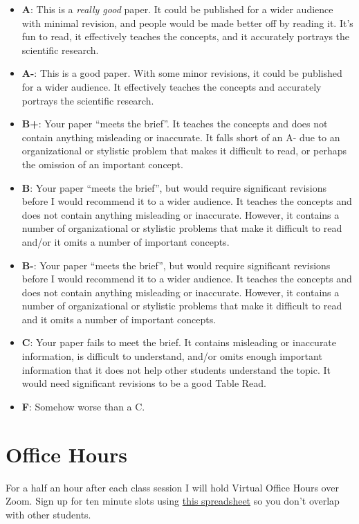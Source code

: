 \documentclass[11pt, letterpaper]{article}
\begin{document}
\begin{itemize}
	\item \textbf{A}: This is a \textit{really good} paper. It could be published for a wider audience with minimal revision, and people would be made better off by reading it. It's fun to read, it effectively teaches the concepts, and it accurately portrays the scientific research.
	\item \textbf{A-}: This is a good paper. With some minor revisions, it could be published for a wider audience. It effectively teaches the concepts and accurately portrays the scientific research. 
	\item \textbf{B+}: Your paper ``meets the brief''. It teaches the concepts and does not contain anything misleading or inaccurate. It falls short of an A- due to an organizational or stylistic problem that makes it difficult to read, or perhaps the omission of an important concept.
	\item \textbf{B}: Your paper ``meets the brief'', but would require significant revisions before I would recommend it to a wider audience. It teaches the concepts and does not contain anything misleading or inaccurate. However, it contains a number of organizational or stylistic problems that make it difficult to read and/or it omits a number of important concepts.
	\item \textbf{B-}: Your paper ``meets the brief'', but would require significant revisions before I would recommend it to a wider audience. It teaches the concepts and does not contain anything misleading or inaccurate. However, it contains a number of organizational or stylistic problems that make it difficult to read and it omits a number of important concepts.
	\item \textbf{C}: Your paper fails to meet the brief. It contains misleading or inaccurate information, is difficult to understand, and/or omits enough important information that it does not help other students understand the topic. It would need significant revisions to be a good Table Read.
	\item \textbf{F}: Somehow worse than a C.
\end{itemize}


\section*{Office Hours}

For a half an hour after each class session I will hold Virtual Office Hours over Zoom. Sign up for ten minute slots using \href{https://docs.google.com/spreadsheets/d/11Pb2gW8iwXT_c4Qdo4Sp3OJzQKFA3zPDnCEsIHdD3C0/edit#gid=0}{this spreadsheet} so you don't overlap with other students.
\end{document}
